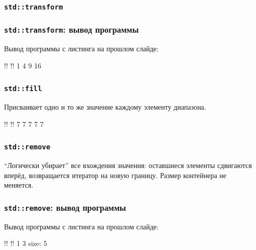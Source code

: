 \documentclass[compress, 8pt, aspectratio=169]{beamer}
\begin{document}
  \begin{frame}[fragile]

    \frametitle{\texttt{std::transform}}


  \end{frame}

  \begin{frame}[fragile]

    \frametitle{\texttt{std::transform}: вывод программы}

    Вывод программы с листинга на прошлом слайде:

    \begin{terminalwindow}
!!
!!
1 4 9 16
    \end{terminalwindow}

  \end{frame}

  \begin{frame}[fragile]

    \frametitle{\texttt{std::fill}}

    Присваивает одно и то же значение каждому элементу диапазона.


    \begin{terminalwindow}
!!
!!
7 7 7 7 7
    \end{terminalwindow}

  \end{frame}

  \begin{frame}[fragile]

    \frametitle{\texttt{std::remove}}

    \enquote{Логически убирает} все вхождения значения:
    оставшиеся элементы сдвигаются вперёд, возвращается итератор
    на новую границу.
    Размер контейнера не меняется.


  \end{frame}

  \begin{frame}[fragile]

    \frametitle{\texttt{std::remove}: вывод программы}

    Вывод программы с листинга на прошлом слайде:

    \begin{terminalwindow}
!!
!!
1 3
size: 5
    \end{terminalwindow}

  \end{frame}
\end{document}
